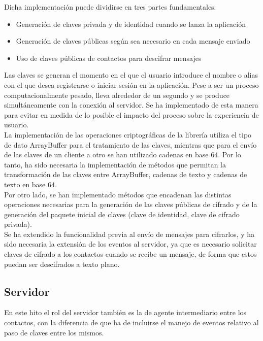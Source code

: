 Dicha implementación puede dividirse en tres partes fundamentales: 

\begin{itemize}
\item {Generación de claves privada y de identidad cuando se lanza la aplicación}
\item {Generación de claves públicas según sea necesario en cada mensaje enviado}
\item {Uso de claves públicas de contactos para descifrar mensajes}
\end{itemize}

Las claves se generan el momento en el que el usuario introduce el nombre o alias con el que desea registrarse o iniciar sesión en la aplicación. Pese a ser un proceso computacionalmente pesado, lleva alrededor de un segundo y se produce simultáneamente con la conexión al servidor. Se ha implementado de esta manera para evitar en medida de lo posible el impacto del proceso sobre la experiencia de usuario. \\

La implementación de las operaciones criptográficas de la librería utiliza el tipo de dato ArrayBuffer para el tratamiento de las claves, mientras que para el envío de las claves de un cliente a otro se han utilizado cadenas en base 64. Por lo tanto, ha sido necesaria la implementación de métodos que permitan la transformación de las claves entre ArrayBuffer, cadenas de texto y cadenas de texto en base 64. \\

Por otro lado, se han implementado métodos que encadenan las distintas operaciones necesarias para la generación de las claves públicas de cifrado y de la generación del paquete inicial de claves (clave de identidad, clave de cifrado privada). \\

Se ha extendido la funcionalidad previa al envío de mensajes para cifrarlos, y ha sido necesaria la extensión de los eventos al servidor, ya que es necesario solicitar claves de cifrado a los contactos cuando se recibe un mensaje, de forma que estos puedan ser descifrados a texto plano.

\subsection{Servidor}

En este hito el rol del servidor también es la de agente intermediario entre los contactos, con la diferencia de que ha de incluirse el manejo de eventos relativo al paso de claves entre los mismos.



